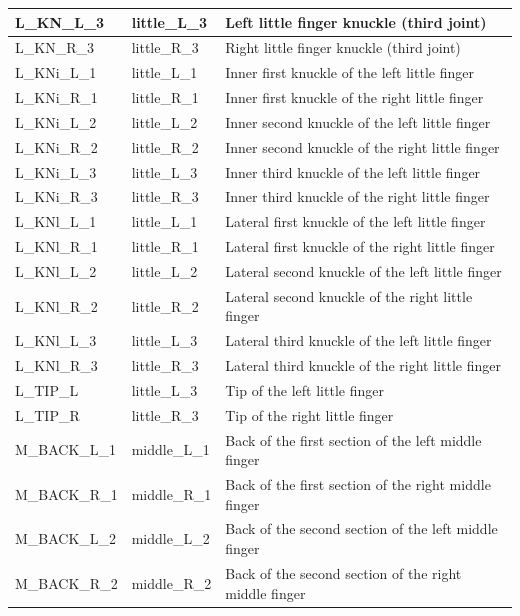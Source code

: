 \documentclass[../main.tex]{subfiles}
\begin{document}
\begin{longtable}{|p{2cm}|p{3cm}|p{5cm}|}
    L\_KN\_L\_3 & little\_L\_3 & Left little finger knuckle (third joint) \\ \hline
    L\_KN\_R\_3 & little\_R\_3 & Right little finger knuckle (third joint) \\ \hline
    L\_KNi\_L\_1 & little\_L\_1 & Inner first knuckle of the left little finger \\ \hline
    L\_KNi\_R\_1 & little\_R\_1 & Inner first knuckle of the right little finger \\ \hline
    L\_KNi\_L\_2 & little\_L\_2 & Inner second knuckle of the left little finger \\ \hline
    L\_KNi\_R\_2 & little\_R\_2 & Inner second knuckle of the right little finger \\ \hline
    L\_KNi\_L\_3 & little\_L\_3 & Inner third knuckle of the left little finger \\ \hline
    L\_KNi\_R\_3 & little\_R\_3 & Inner third knuckle of the right little finger \\ \hline
    L\_KNl\_L\_1 & little\_L\_1 & Lateral first knuckle of the left little finger \\ \hline
    L\_KNl\_R\_1 & little\_R\_1 & Lateral first knuckle of the right little finger \\ \hline
    L\_KNl\_L\_2 & little\_L\_2 & Lateral second knuckle of the left little finger \\ \hline
    L\_KNl\_R\_2 & little\_R\_2 & Lateral second knuckle of the right little finger \\ \hline
    L\_KNl\_L\_3 & little\_L\_3 & Lateral third knuckle of the left little finger \\ \hline
    L\_KNl\_R\_3 & little\_R\_3 & Lateral third knuckle of the right little finger \\ \hline
    L\_TIP\_L & little\_L\_3 & Tip of the left little finger \\ \hline
    L\_TIP\_R & little\_R\_3 & Tip of the right little finger \\ \hline
    M\_BACK\_L\_1 & middle\_L\_1 & Back of the first section of the left middle finger \\ \hline
    M\_BACK\_R\_1 & middle\_R\_1 & Back of the first section of the right middle finger \\ \hline
    M\_BACK\_L\_2 & middle\_L\_2 & Back of the second section of the left middle finger \\ \hline
    M\_BACK\_R\_2 & middle\_R\_2 & Back of the second section of the right middle finger \\ \hline

\end{longtable}
\end{document}
